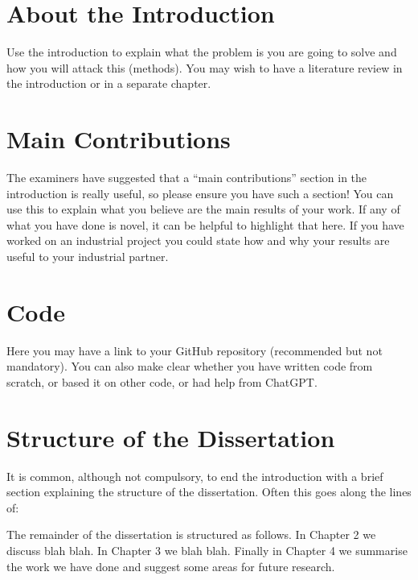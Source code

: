 \section{About the Introduction}

Use the introduction to explain what the problem is you are going to solve and how you will attack this (methods). You may wish to have a literature review in the introduction or in a separate chapter.

\section{Main Contributions}

The examiners have suggested that a ``main contributions'' section in the introduction is really useful, so please ensure you have such a section! You can use this to explain what you believe are the main results of your work. If any of what you have done is novel, it can be helpful to highlight that here. If you have worked on an industrial project you could state how and why your results are useful to your industrial partner.

\section{Code}

Here you may have a link to your GitHub repository (recommended but not mandatory). You can also make clear whether you have written code from scratch, or based it on other code, or had help from ChatGPT.

\section{Structure of the Dissertation}

It is common, although not compulsory, to end the introduction with a brief section explaining the structure of the dissertation. Often this goes along the lines of:

The remainder of the dissertation is structured as follows. In Chapter 2 we discuss blah blah. In Chapter 3 we blah blah. Finally in Chapter 4 we summarise the work we have done and suggest some areas for future research.

